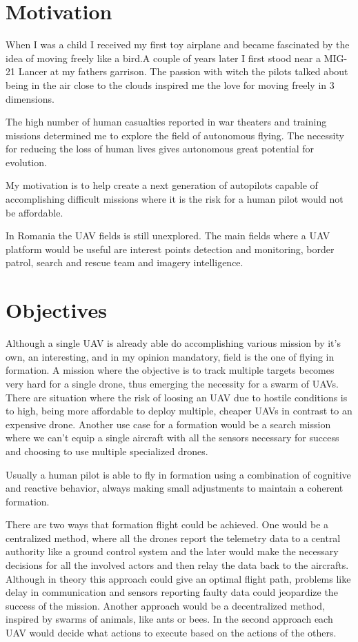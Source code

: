 \section{Motivation}
\label{sec:motivation}
When I was a child I received my first toy airplane and became fascinated
by the idea of moving freely like a bird.A couple of years later I first stood 
near a MIG-21 Lancer at my fathers garrison. The passion with witch the pilots 
talked about being in the air close to the clouds inspired me the love for moving 
freely in 3 dimensions.

The high number of human casualties reported in war theaters and training missions
determined me to explore the field of autonomous flying. The necessity for reducing
the loss of human lives gives autonomous great potential for evolution.

My motivation is to help create a next generation of autopilots capable of 
accomplishing difficult missions where it is the risk for a human pilot would 
not be affordable.

In Romania the UAV fields is still unexplored. The main fields where a UAV
platform would be useful are interest points detection and monitoring, border
patrol, search and rescue team and imagery intelligence.

\section{Objectives}
\label{sec:objectives}

Although a single UAV is already able do accomplishing various mission by it's
own, an interesting, and in my opinion mandatory,  field is the one of flying in
formation. A mission where the objective is to track multiple targets becomes
very hard for a single drone, thus emerging the necessity for a swarm of UAVs.
There are situation where the risk of loosing an UAV due to hostile conditions
is to high, being more affordable to deploy multiple,  cheaper UAVs in contrast
to an expensive drone. Another use case for a formation would be a search mission
where we can't equip a single aircraft with all the sensors necessary for success
and choosing to use multiple specialized drones.

Usually a human pilot is able to fly in formation using a combination of
cognitive and reactive behavior,  always making small adjustments to maintain a
coherent formation.

There are two ways that formation flight could be achieved. One would be a 
centralized method,  where all the drones report the telemetry data to a central
authority like a ground control system and the later would make the necessary 
decisions for all the involved actors and then relay the data back to the aircrafts.
Although in theory this approach could give an optimal flight path,  problems
like delay in communication and sensors reporting faulty data could jeopardize
the success of the mission. Another approach would be a decentralized method, 
inspired by swarms of animals, like ants or bees. In the second approach each 
UAV would decide what actions to execute based on the actions of the others.

